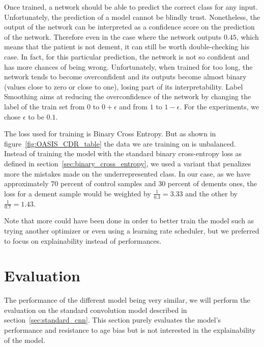 Once trained, a network should be able to predict the correct class for any input. Unfortunately, the prediction of a model cannot be blindly trust. Nonetheless, the output of the network can be interpreted as a confidence score on the prediction of the network. Therefore even in the case where the network outputs $0.45$, which means that the patient is not dement, it can still be worth double-checking his case. In fact, for this particular prediction, the network is not so confident and has more chances of being wrong. Unfortunately, when trained for too long, the network tends to become overconfident and its outputs become almost binary (values close to zero or close to one), losing part of its interpretability. Label Smoothing \cite{label_smoothing_szegedy2015rethinking} aims at reducing the overconfidence of the network by changing the label of the train set from $0$ to $0 + \epsilon$ and from $1$ to $1 - \epsilon$. For the experiments, we chose $\epsilon$ to be $0.1$.

The loss used for training is Binary Cross Entropy. But as shown in figure~\ref{fig:OASIS_CDR_table} the data we are training on is unbalanced. Instead of training the model with the standard binary cross-entropy loss as defined in section~\ref{sec:binary_cross_entropy}, we used a variant that penalizes more the mistakes made on the underrepresented class. In our case, as we have approximately 70 percent of control samples and 30 percent of dements ones, the loss for a dement sample would be weighted by $\frac{1}{0.3} = 3.33$ and the other by $\frac{1}{0.7} = 1.43$.

Note that more could have been done in order to better train the model such as trying another optimizer or even using a learning rate scheduler, but we preferred to focus on explainability instead of performances.

\section{Evaluation}
The performance of the different model being very similar, we will perform the evaluation on the standard convolution model described in section~\ref{sec:standard_cnn}. This section purely evaluates the model's performance and resistance to age bias but is not interested in the explainability of the model. 


